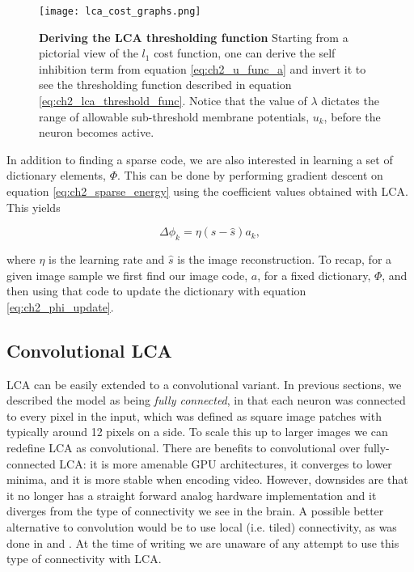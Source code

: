 \begin{figure}[ht]\label{fig:ch2_lca_thresh}
\centering %
\texttt{[image: lca\_cost\_graphs.png]}
\caption{\textbf{Deriving the LCA thresholding function} Starting from a pictorial view of the $l_{1}$ cost function, one can derive the self inhibition term from equation \eqref{eq:ch2_u_func_a} and invert it to see the thresholding function described in equation \eqref{eq:ch2_lca_threshold_func}. Notice that the value of $\lambda$ dictates the range of allowable sub-threshold membrane potentials, $u_{k}$, before the neuron becomes active.}
\end{figure}

In addition to finding a sparse code, we are also interested in learning a set of dictionary elements, $\Phi$. This can be done by performing gradient descent on equation \eqref{eq:ch2_sparse_energy} using the coefficient values obtained with LCA. This yields

\begin{equation}\label{eq:ch2_phi_update}
    \Delta \phi_{k} = \eta (s - \hat{s}) a_{k},
\end{equation}

\noindent where $\eta$ is the learning rate and $\hat{s}$ is the image reconstruction. To recap, for a given image sample we first find our image code, $a$, for a fixed dictionary, $\Phi$, and then using that code to update the dictionary with equation \eqref{eq:ch2_phi_update}.


\subsection{Convolutional LCA}
LCA can be easily extended to a convolutional variant. In previous sections, we described the model as being \textit{fully connected}, in that each neuron was connected to every pixel in the input, which was defined as square image patches with typically around 12 pixels on a side. To scale this up to larger images we can redefine LCA as convolutional. There are benefits to convolutional over fully-connected LCA: it is more amenable GPU architectures, it converges to lower minima, and it is more stable when encoding video. However, downsides are that it no longer has a straight forward analog hardware implementation and it diverges from the type of connectivity we see in the brain. A possible better alternative to convolution would be to use local (i.e. tiled) connectivity, as was done in \parencite{le2011building} and \parencite{ngiam2010tiled}. At the time of writing we are unaware of any attempt to use this type of connectivity with LCA. 

